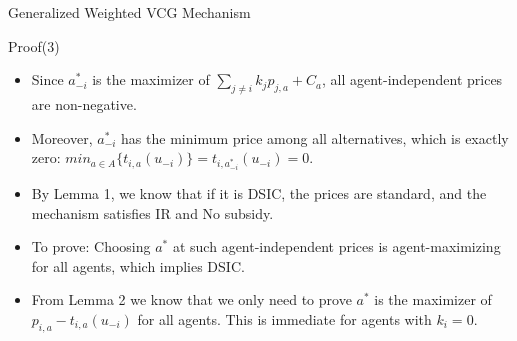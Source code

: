 \begin{frame}{Generalized Weighted VCG Mechanism}
\begin{block}{Proof(3)}
\begin{itemize}
    \item Since $a_{-i}^{*}$ is the maximizer of $\sum _{j \neq i}k_{j}p_{j,a} + C_{a}$, all agent-independent prices are non-negative.
    \item Moreover, $a_{-i}^{*}$ has the minimum price among all alternatives, which is exactly zero: $min_{a \in A}\{t_{i,a}(u_{-i})\} = t_{i,a_{-i}^{*}}(u_{-i})=0$.
    \item By Lemma 1, we know that if it is DSIC, the prices are standard, and the mechanism satisfies IR and No subsidy.
    \item To prove: Choosing $a^{*}$ at such agent-independent prices is agent-maximizing for all agents, which implies DSIC.
    \item From Lemma 2 we know that we only need to prove $a^{*}$ is the maximizer of $p_{i,a}-t_{i,a}(u_{-i})$ for all agents. This is immediate for agents with $k_{i}=0$.
\end{itemize}
\end{block}
\end{frame}

